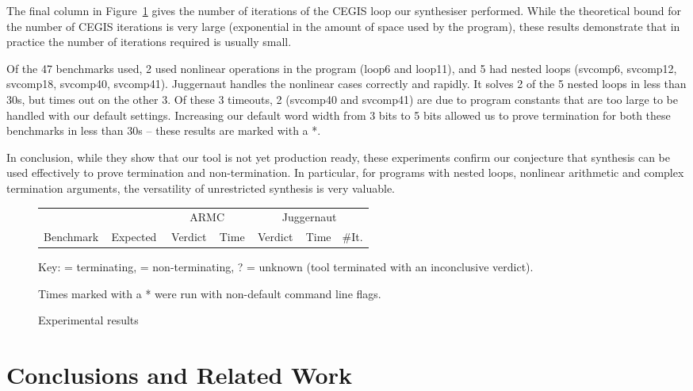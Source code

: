 \documentclass[preprint]{sigplanconf}
\theoremstyle{definition}
\newcommand{\xmark}{\ding{55}}
\newcommand{\tick}{\checkmark}
\begin{document}
The final column in Figure~\ref{fig:experiments} gives the number of
iterations of the CEGIS loop our synthesiser performed.  While the
theoretical bound for the number of CEGIS iterations is very large
(exponential in the amount of space used by the program), these results
demonstrate that in practice the number of iterations required is usually
small.

Of the 47 benchmarks used, 2 used nonlinear operations in the program (loop6 and loop11),
and 5 had nested loops (svcomp6, svcomp12, svcomp18, svcomp40, svcomp41).
{\sc Juggernaut} handles the nonlinear cases correctly and rapidly.
It solves 2 of the 5 nested loops in less than 30s, but times out on the other
3.  Of these 3 timeouts, 2 (svcomp40 and svcomp41) are due to program constants that
are too large to be handled with our default settings.  Increasing
our default word width from 3 bits to 5 bits allowed us to prove termination
for both these benchmarks in less than 30s -- these results are marked with a *.

In conclusion, while they show that our tool is not yet production ready,
these experiments confirm our conjecture that synthesis can be used
effectively to prove termination and non-termination.  In particular,
for programs with nested loops, nonlinear arithmetic and complex
termination arguments, the versatility of unrestricted synthesis
is very valuable.

\begin{figure}
\centering
\scriptsize
\begin{tabular}{|l|@{}c@{}||@{}c@{}|r||@{}c@{}|r|r|}
\hline
          &             & \multicolumn{2}{|c||}{\sc ARMC} & \multicolumn{3}{|c|}{\sc Juggernaut} \\
Benchmark & \,Expected\, & \,Verdict\, & Time & \,Verdict\, & Time & \#It.\\
    \hline
    \hline

    \hline
\end{tabular}

Key: \tick = terminating, \xmark = non-terminating, ? = unknown (tool terminated with an inconclusive verdict).

Times marked with a * were run with non-default command line flags.

\caption{Experimental results\label{fig:experiments}}
 \end{figure}

\section{Conclusions and Related Work}
\end{document}
